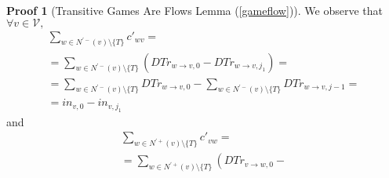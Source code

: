 \documentclass[11pt]{llncs}
\theoremstyle{definition}
\newtheorem{sepproof}{Proof}
\begin{document}
\begin{sepproof}[Transitive Games Are Flows Lemma (\ref{gameflow})]
       We observe that $\forall v \in \mathcal{V},$
       \begin{equation}
       \label{gameflowin}
       \begin{gathered}
          \sum\limits_{w \in N^{'-}\left(v\right) \setminus \{T\}}c'_{wv} = \\
          = \sum\limits_{w \in N^{'-}\left(v\right) \setminus \{T\}}\left(DTr_{w \rightarrow v, 0} -
          DTr_{w \rightarrow v, j_1}\right) = \\
          = \sum\limits_{w \in N^{'-}\left(v\right) \setminus \{T\}}DTr_{w \rightarrow v, 0} -
          \sum\limits_{w \in N^{'-}\left(v\right) \setminus \{T\}}DTr_{w \rightarrow v, j-1} =  \\
          = in_{v, 0} - in_{v, j_1}
       \end{gathered}
       \end{equation}
       and
       \begin{equation}
       \label{gameflowout}
       \begin{gathered}
          \sum\limits_{w \in N^{'+}\left(v\right) \setminus \{T\}}c'_{vw} = \\
          = \sum\limits_{w \in N^{'+}\left(v\right) \setminus \{T\}}\left(DTr_{v \rightarrow w, 0} -

\end{gathered}
\end{equation}
\end{sepproof}
\end{document}

